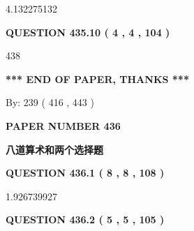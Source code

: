 \documentclass{ctexart}
\begin{document}
4.132275132
 
 
  
\vspace{0.2in}
  
{\textbf{\Large{QUESTION
435.10 
 ( 4 , 4 , 104 )
}}}
  
  
 
 
\noindent{}

438
 
 
   
   
 \vspace{0.2in}
 
   
   
   
   
\vspace{1.0in} 
{\textbf{\large{ *** END OF PAPER, THANKS *** }}} 
   
   
\hspace{1.0in} By: 
 239 ( 416 ,  443 )
   
   
   
   
\newpage 
\setcounter{page}{ 
   436001 } 
   
   
   
   
 {\textbf{ \Large{ PAPER NUMBER  436  }}}
   
   
\vspace{0.2in}
   
   
   
   
   
   
 \vspace{0.2in}
{\LARGE {\textbf{ 八道算术和两个选择题}}}
   
   
  
\vspace{0.2in}
  
{\textbf{\Large{QUESTION
436.1 
 ( 8 , 8 , 108 )
}}}
  
  
 
 
\noindent{}

1.926739927
 
 
  
\vspace{0.2in}
  
{\textbf{\Large{QUESTION
436.2 
 ( 5 , 5 , 105 )
}}}
  
  
 
 
\noindent{}
\end{document}
